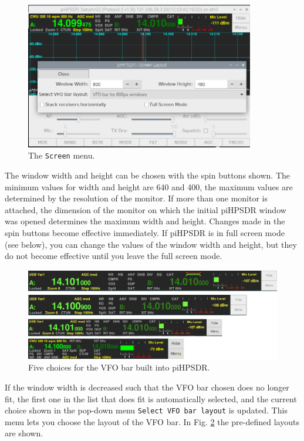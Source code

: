 \documentclass[12pt]{book}
\def\rett#1{\texttt{\color{red}#1}}
\def\bltt#1{\texttt{\color{blue}#1}}
\def\pH{pi\-HPSDR\xspace}
\begin{document}
\begin{figure}[ht]
\center
\includegraphics[width=10cm]{ScreenMenu.png}
\caption{The \bltt{Screen} menu.}
\label{fig:ScreenMenu}
\end{figure}

The window width and height can be chosen with the spin buttons shown. The minimum
values for width and height are 640 and 400, the maximum values are determined by
the resolution of the monitor. If more than one monitor is attached, the dimension
of the monitor on which the initial \pH window was opened determines
the maximum width and height. Changes made in the spin buttons become effective
immediately. If \pH is in full screen mode (see below), you can change the
values of the window width and height, but they do not become effective until
you leave the full screen mode.

\begin{figure}[ht!]
\center
\includegraphics[width=12cm]{VFObarChoice.png}
\caption{Five choices for the VFO bar built into \pH.}
\label{fig:VFObarChoice}
\end{figure}

If the window width is decreased such that the VFO bar chosen does no longer fit,
the first one in the list that does fit is automatically selected, and the
current choice shown in the
 pop-down menu \rett{Select VFO bar layout} is updated. This menu lets you choose
 the layout of the VFO
bar. In Fig. \ref{fig:VFObarChoice} the pre-defined layouts are shown.
\end{document}

